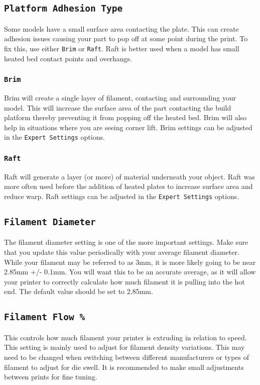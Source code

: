 \subsection{\texttt{Platform Adhesion Type}}
Some models have a small surface area contacting the plate. This can create adhesion issues causing your part to pop off at some point during the print. To fix this, use either \texttt{Brim} or \texttt{Raft}. Raft is better used when a model has small heated bed contact points and overhangs.

\subsubsection{\texttt{Brim}}
Brim will create a single layer of filament, contacting and surrounding your model. This will increase the surface area of the part contacting the build platform thereby preventing it from popping off the heated bed. Brim will also help in situations where you are seeing corner lift. Brim settings can be adjusted in the \texttt{Expert Settings} options.

\subsubsection{\texttt{Raft}}
Raft will generate a layer (or more) of material underneath your object. Raft was more often used before the addition of heated plates to increase surface area and reduce warp. Raft settings can be adjusted in the \texttt{Expert Settings} options.

\subsection{\texttt{Filament Diameter}}
The filament diameter setting is one of the more important settings. Make sure that you update this value periodically with your average filament diameter. While your filament may be referred to as 3mm, it is more likely going to be near 2.85mm +/- 0.1mm. You will want this to be an accurate average, as it will allow your printer to correctly calculate how much filament it is pulling into the hot end. The default value should be set to 2.85mm.

\subsection{\texttt{Filament Flow \%}}
This controls how much filament your printer is extruding in relation to speed. This setting is mainly used to adjust for filament density variations. This may need to be changed when switching between different manufacturers or types of filament to adjust for die swell. It is recommended to make small adjustments between prints for fine tuning.

